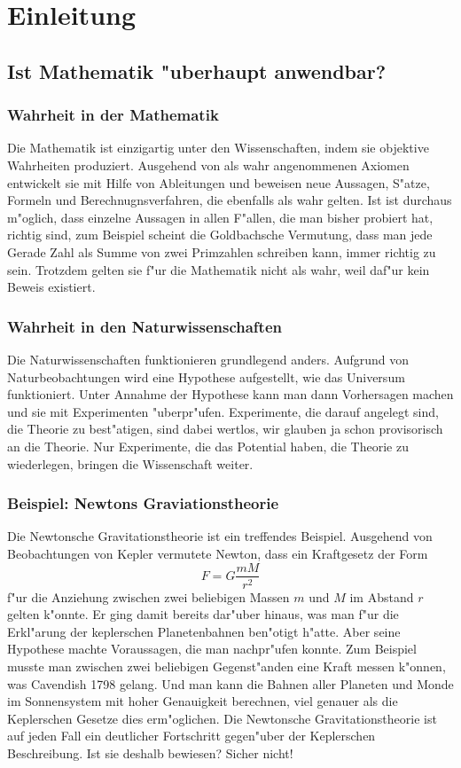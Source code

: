 %
%
\chapter*{Einleitung}
\section*{Ist Mathematik "uberhaupt anwendbar?}
\subsection*{Wahrheit in der Mathematik}
Die Mathematik ist einzigartig unter den Wissenschaften, indem
sie objektive Wahrheiten produziert.
Ausgehend von als wahr angenommenen Axiomen entwickelt sie mit 
Hilfe von Ableitungen und beweisen neue Aussagen, S"atze, Formeln
und Berechnugnsverfahren, die ebenfalls als wahr gelten.
Ist ist durchaus m"oglich, dass einzelne Aussagen in allen
F"allen, die man bisher probiert hat, richtig sind, zum Beispiel
scheint die Goldbachsche Vermutung, dass man jede Gerade Zahl als
Summe von zwei Primzahlen schreiben kann, immer richtig zu sein.
Trotzdem gelten sie f"ur die Mathematik nicht als wahr, weil
daf"ur kein Beweis existiert.

\subsection*{Wahrheit in den Naturwissenschaften}
Die Naturwissenschaften funktionieren grundlegend anders.
Aufgrund von Naturbeobachtungen wird eine Hypothese aufgestellt,
wie das Universum funktioniert.
Unter Annahme der Hypothese kann man dann Vorhersagen machen
und sie mit Experimenten "uberpr"ufen. 
Experimente, die darauf angelegt sind, die Theorie zu best"atigen,
sind dabei wertlos,
wir glauben ja schon provisorisch an die Theorie.
Nur Experimente, die das Potential haben, die Theorie zu
wiederlegen, bringen die Wissenschaft weiter.

\subsection*{Beispiel: Newtons Graviationstheorie}
Die Newtonsche Gravitationstheorie ist ein treffendes Beispiel.
Ausgehend von Beobachtungen von Kepler vermutete Newton, dass
ein Kraftgesetz der Form
\[
F=G\frac{mM}{r^2}
\]
f"ur die Anziehung zwischen zwei beliebigen Massen $m$ und $M$ im Abstand $r$
gelten k"onnte.
Er ging damit bereits dar"uber hinaus, was man f"ur die Erkl"arung der
keplerschen Planetenbahnen ben"otigt h"atte.
Aber seine Hypothese machte Voraussagen, die man nachpr"ufen konnte.
Zum Beispiel musste man zwischen zwei beliebigen Gegenst"anden eine
Kraft messen k"onnen, was Cavendish 1798 gelang.
Und man kann die Bahnen aller Planeten und Monde im
Sonnensystem mit hoher Genauigkeit berechnen, viel genauer als die
Keplerschen Gesetze dies erm"oglichen.
Die Newtonsche Gravitationstheorie ist auf jeden Fall ein deutlicher
Fortschritt gegen"uber der Keplerschen Beschreibung.
Ist sie deshalb bewiesen? Sicher nicht!

